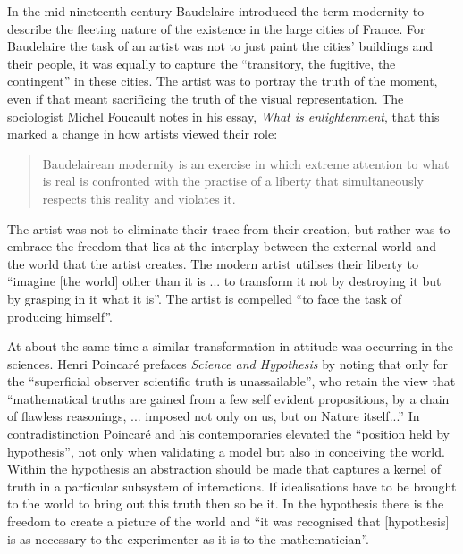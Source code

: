 In the mid-nineteenth century Baudelaire introduced the term modernity 
to describe the fleeting nature of the existence in the large cities of France.
For Baudelaire the task of an artist was not to just paint the cities' buildings and their people,  
it was equally to capture the ``transitory, the fugitive, the contingent''\cite{BoudelairePainterofModernLife} in these cities.
The artist was to portray the truth of the moment, even if that meant sacrificing the truth of the visual representation.
The sociologist Michel Foucault notes in his essay, {\em What is enlightenment}\cite{FoucaultWhatIsEnlightenment}, that this marked a change in how artists viewed their role:
\begin{quote}
  Baudelairean modernity is an exercise in which extreme attention to
  what is real is confronted with the practise of a liberty that
  simultaneously respects this reality and violates it.
\end{quote}
The artist was not to eliminate their trace from their creation,
but rather was to embrace the freedom
that lies at the interplay between the external world  and the world
that the artist creates.  The modern artist utilises their liberty to ``imagine 
[the world] other than it is ... to transform it not by destroying it but by grasping in it
what it is''. 
The artist is compelled ``to face the task of producing himself''\cite{FoucaultWhatIsEnlightenment}.


At about the same time a similar transformation in attitude was occurring in the sciences.
Henri Poincar{\'e} prefaces {\em Science and Hypothesis}\cite*{Poincare1902} by noting
that only for the ``superficial observer scientific truth is unassailable'',
who retain the view that %
``mathematical truths are gained from a few self evident propositions,
 by a chain of flawless reasonings, ... imposed not only on us, but on Nature itself...''
%
In contradistinction Poincar{\'e} and his contemporaries elevated the ``position held by hypothesis'',
not only when validating a model but also in conceiving the world.
Within the hypothesis an abstraction should be made that captures a kernel of truth in a particular subsystem of interactions.
If idealisations have to be brought to the world to bring out this truth then so be it.
In the hypothesis there is the freedom to create a picture of the world
and ``it was recognised that [hypothesis] is as necessary to the experimenter as it is to the mathematician''.


